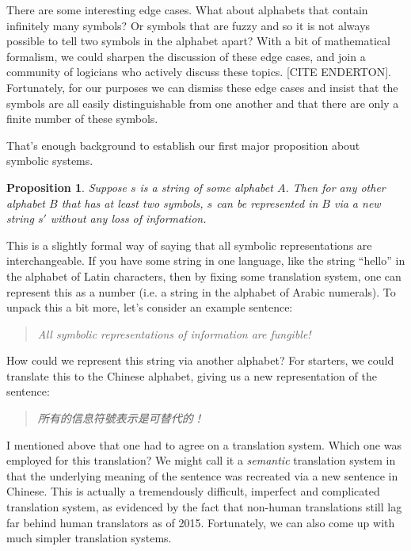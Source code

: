 \documentclass[UTF8]{book}
\newtheorem{theorem}{Proposition}
\begin{document}
\begin{CJK}{UTF8}{gbsn}
There are some interesting edge cases. What about alphabets that contain infinitely many symbols? Or symbols that are fuzzy and so it is not always possible to tell two symbols in the alphabet apart? With a bit of mathematical formalism, we could sharpen the discussion of these edge cases, and join a community of logicians who actively discuss these topics. [CITE ENDERTON]. Fortunately, for our purposes we can dismiss these edge cases and insist that the symbols are all easily distinguishable from one another and that there are only a finite number of these symbols.

That's enough background to establish our first major proposition about symbolic systems.

\begin{theorem}
Suppose $s$ is a string of some alphabet $A$. Then for any other alphabet $B$ that has at least two symbols, $s$ can be represented in $B$ via a new string $s'$ without any loss of information.
\end{theorem}

This is a slightly formal way of saying that all symbolic representations are interchangeable. If you have some string in one language, like the string ``hello'' in the alphabet of Latin characters, then by fixing some translation system, one can represent this as a number (i.e. a string in the alphabet of Arabic numerals). To unpack this a bit more, let's consider an example sentence:

\begin{quotation}
\centering
\emph{All symbolic representations of information are fungible!}
\end{quotation}

How could we represent this string via another alphabet? For starters, we could translate this to the Chinese alphabet, giving us a new representation of the sentence:

\begin{quotation}
\centering
\emph{所有的信息符號表示是可替代的！}
\end{quotation}

I mentioned above that one had to agree on a translation system.  Which one was employed for this translation? We might call it a \emph{semantic} translation system in that the underlying meaning of the sentence was recreated via a new sentence in Chinese. This is actually a tremendously difficult, imperfect and complicated translation system, as evidenced by the fact that non-human translations still lag far behind human translators as of 2015. Fortunately, we can also come up with much simpler translation systems.


\end{CJK}
\end{document}
